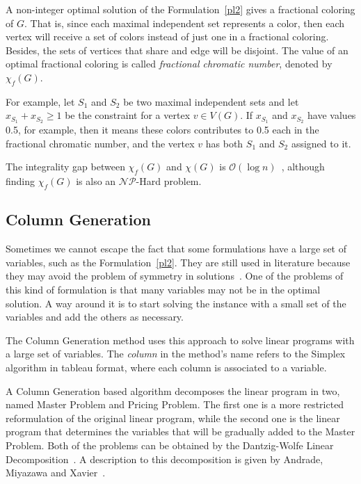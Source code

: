 \documentclass[fleqn,10pt]{SelfArx} %
\newcommand{\NP}{\ensuremath{\mathcal{N}\mathcal{P}}}
\newcommand{\cO}{\mathcal{O}}
\begin{document}
	A non-integer optimal solution of the Formulation~\eqref{pl2} gives a
	fractional coloring of $G$. That is, since each maximal independent
	set represents a color, then each vertex will receive a set of colors
	instead of just one in a fractional coloring. Besides, the sets of
	vertices that share and edge will be disjoint. The value of an optimal
	fractional coloring is called \emph{fractional chromatic number}, denoted by
	$\chi_f(G)$.
	
	For example, let $S_1$ and $S_2$ be two maximal independent sets and
	let $x_{S_1}+x_{S_2} \geq 1$ be the constraint for a vertex $v \in
	V(G)$. If $x_{S_1}$ and $x_{S_2}$ have values 0.5, for example, then
	it means these colors contributes to 0.5 each in the fractional
	chromatic number, and the vertex $v$ has both $S_1$ and $S_2$
	assigned to it.
	
	The integrality gap between $\chi_f(G)$ and $\chi(G)$ is $\cO(\log
	n)$\linebreak~\cite{Lund1994}, although finding $\chi_f(G)$ is also an $\NP$-Hard
	problem.
	
	\subsection{Column Generation}
	
	Sometimes we cannot escape the fact that some formulations have a
	large set of variables, such as the Formulation~\eqref{pl2}. They are
	still used in literature because they may avoid the problem of
	symmetry in solutions~\cite{Barnhart98}. One of the problems of this
	kind of formulation is that many variables may not be in the optimal
	solution. A way around it is to start solving the instance with a
	small set of the variables and add the others as necessary.
	
	The Column Generation method uses this approach to solve linear programs with a large set
	of variables. The \emph{column} in the method's name refers to
	the Simplex algorithm in tableau format, where each column is
	associated to a variable.
	
	A Column Generation based algorithm decomposes the linear program in
	two, named Master Problem and Pricing Problem. The first one is a more
	restricted reformulation of the original linear program, while the
	second one is the linear program that determines the variables that
	will be gradually added to the Master Problem. Both of the problems
	can be obtained by the Dantzig-Wolfe Linear Decomposition~\cite{Dantzig1963}. A description to this decomposition is given by Andrade, Miyazawa and Xavier~\cite{Andrade2006}.
	
\end{document}
